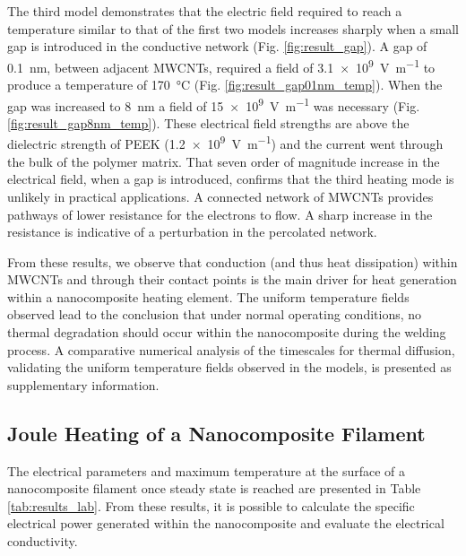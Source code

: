 \documentclass[11pt,review,times]{elsarticle}
\begin{document}
The third model demonstrates that the electric field required to reach a temperature similar to that of the first two models increases sharply when a small gap is introduced in the conductive network (Fig. \ref{fig:result_gap}). 
A gap of \SI{0.1}{\nano\metre}, between adjacent MWCNTs, required a field of \SI{3.1e9}{\volt\per\metre} to produce a temperature of \SI{170}{\celsius} (Fig. \ref{fig:result_gap01nm_temp}). 
When the gap was increased to \SI{8}{\nano\metre} a field of \SI{15e9}{\volt\per\metre} was necessary (Fig. \ref{fig:result_gap8nm_temp}). 
These electrical field strengths are above the dielectric strength of PEEK (\SI{1.2e9}{\volt\per\metre}) and the current went through the bulk of the polymer matrix. 
That seven order of magnitude increase in the electrical field, when a gap is introduced, confirms that the third heating mode is unlikely in practical applications. 
A connected network of MWCNTs provides pathways of lower resistance for the electrons to flow. 
A sharp increase in the resistance is indicative of a perturbation in the percolated network. 

From these results, we observe that conduction (and thus heat dissipation) within MWCNTs and through their contact points is the main driver for heat generation within a nanocomposite heating element. 
The uniform temperature fields observed lead to the conclusion that under normal operating conditions, no thermal degradation should occur within the nanocomposite during the welding process. 
A comparative numerical analysis of the timescales for thermal diffusion, validating the uniform temperature fields observed in the models, is presented as supplementary information.  

\subsection{Joule Heating of a Nanocomposite Filament}

The electrical parameters and maximum temperature at the surface of a nanocomposite filament once steady state is reached are presented in Table \ref{tab:results_lab}. 
From these results, it is possible to calculate the specific electrical power generated within the nanocomposite and evaluate the electrical conductivity. 
\end{document}
